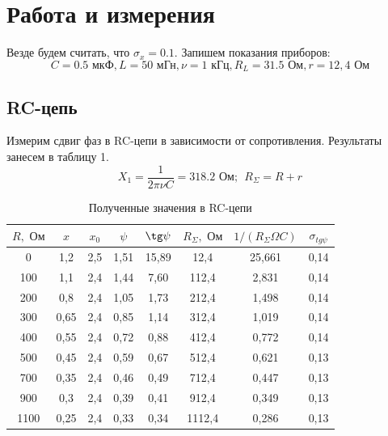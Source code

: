 \documentclass[a4paper, 12pt]{article}
\begin{document}
\newpage
\section{Работа и измерения}

Везде будем считать, что $\sigma_x=0.1$. Запишем показания приборов: 
$$C = 0.5 \text{ мкФ},
L =50 \text{ мГн},
\nu = 1 \text{ кГц},
R_L = 31.5 \text{ Ом},
r = 12,4 \text{ Ом}$$

\subsection*{RC-цепь}
Измерим сдвиг фаз в RC-цепи в зависимости от сопротивления. Результаты занесем в таблицу 1.
$$X_1 = \dfrac{1}{2 \pi \nu C} = 318.2\text{ Ом};~~R_{\Sigma} =R+r $$

\begin{table}[H]
\centering
\begin{tabular}{|c|c|c|c|c|c|c|c|}
\hline
$R, \text{ Ом}$ & $x$ & $x_0$ & $\psi$ & $\tg \psi$ & $R_{\Sigma}, \text{ Ом}$ & $1/(R_{\Sigma} \Omega C)$ & $\sigma_{tg\psi}$\\ \hline
0&	1,2&	2,5&	1,51&	15,89&	12,4&	25,661&	0,14\\ \hline
100&	1,1&	2,4&	1,44&	7,60&	112,4&	2,831&	0,14\\ \hline
200&	0,8&	2,4&	1,05&	1,73&	212,4&	1,498&	0,14\\ \hline
300&	0,65&	2,4&	0,85&	1,14&	312,4&	1,019&	0,14\\ \hline
400&	0,55&	2,4&	0,72&	0,88&	412,4&	0,772&	0,14\\ \hline
500&	0,45&	2,4&	0,59&	0,67&	512,4&	0,621&	0,13\\ \hline
700&	0,35&	2,4&	0,46&	0,49&	712,4&	0,447&	0,13\\ \hline
900&	0,3&	2,4&	0,39&	0,41&	912,4&	0,349&	0,13\\ \hline
1100&	0,25&	2,4&	0,33&	0,34&	1112,4&	0,286&	0,13\\ \hline
\end{tabular}
\caption{Полученные значения в RC-цепи}
\end{table}
\end{document}
